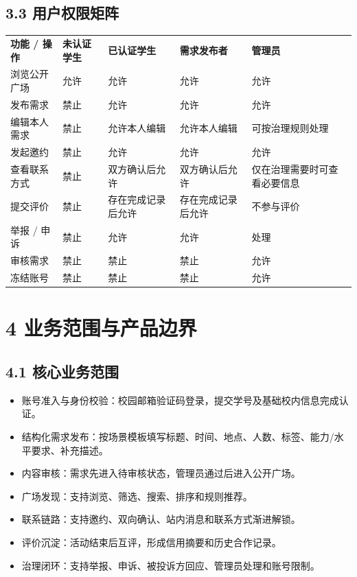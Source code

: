 \section{3.3
用户权限矩阵}\label{ux7528ux6237ux6743ux9650ux77e9ux9635}

{\def\LTcaptype{none} %
\begin{xltabular}{\textwidth}{@{}>{\centering\arraybackslash}X>{\centering\arraybackslash}X>{\centering\arraybackslash}X>{\centering\arraybackslash}X>{\centering\arraybackslash}X@{}}
\toprule\noalign{}
\endhead
\bottomrule\noalign{}
\endlastfoot
\textbf{功能 / 操作} & \textbf{未认证学生} & \textbf{已认证学生} &
\textbf{需求发布者} & \textbf{管理员} \\
浏览公开广场 & 允许 & 允许 & 允许 & 允许 \\
发布需求 & 禁止 & 允许 & 允许 & 允许 \\
编辑本人需求 & 禁止 & 允许本人编辑 & 允许本人编辑 & 可按治理规则处理 \\
发起邀约 & 禁止 & 允许 & 允许 & 允许 \\
查看联系方式 & 禁止 & 双方确认后允许 & 双方确认后允许 &
仅在治理需要时可查看必要信息 \\
提交评价 & 禁止 & 存在完成记录后允许 & 存在完成记录后允许 &
不参与评价 \\
举报 / 申诉 & 禁止 & 允许 & 允许 & 处理 \\
审核需求 & 禁止 & 禁止 & 禁止 & 允许 \\
冻结账号 & 禁止 & 禁止 & 禁止 & 允许 \\
\end{xltabular}
}

\chapter{4
业务范围与产品边界}\label{ux4e1aux52a1ux8303ux56f4ux4e0eux4ea7ux54c1ux8fb9ux754c}

\section{4.1
核心业务范围}\label{ux6838ux5fc3ux4e1aux52a1ux8303ux56f4}

\begin{itemize}
\item
  账号准入与身份校验：校园邮箱验证码登录，提交学号及基础校内信息完成认证。
\item
  结构化需求发布：按场景模板填写标题、时间、地点、人数、标签、能力/水平要求、补充描述。
\item
  内容审核：需求先进入待审核状态，管理员通过后进入公开广场。
\item
  广场发现：支持浏览、筛选、搜索、排序和规则推荐。
\item
  联系链路：支持邀约、双向确认、站内消息和联系方式渐进解锁。
\item
  评价沉淀：活动结束后互评，形成信用摘要和历史合作记录。
\item
  治理闭环：支持举报、申诉、被投诉方回应、管理员处理和账号限制。
\end{itemize}

